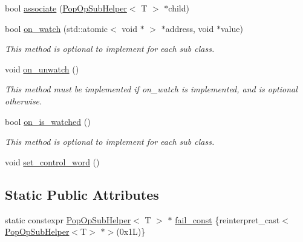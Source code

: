 \begin{DoxyCompactItemize}
bool \hyperlink{classtervel_1_1containers_1_1wf_1_1vector_1_1_pop_op_helper_a7d5839d23d38c1c1762f2b04afb04ff4}{associate} (\hyperlink{classtervel_1_1containers_1_1wf_1_1vector_1_1_pop_op_sub_helper}{Pop\+Op\+Sub\+Helper}$<$ T $>$ $\ast$child)
\item 
bool \hyperlink{classtervel_1_1containers_1_1wf_1_1vector_1_1_pop_op_helper_a2b421b2a3cb984bd94abe3ee254ac819}{on\+\_\+watch} (std\+::atomic$<$ void $\ast$ $>$ $\ast$address, void $\ast$value)
\begin{DoxyCompactList}\small\item\em This method is optional to implement for each sub class. \end{DoxyCompactList}\item 
void \hyperlink{classtervel_1_1containers_1_1wf_1_1vector_1_1_pop_op_helper_a90ee1e07905e336a864184e96d04bf96}{on\+\_\+unwatch} ()
\begin{DoxyCompactList}\small\item\em This method must be implemented if on\+\_\+watch is implemented, and is optional otherwise. \end{DoxyCompactList}\item 
bool \hyperlink{classtervel_1_1containers_1_1wf_1_1vector_1_1_pop_op_helper_afc30533f275eb109ae847e0038404360}{on\+\_\+is\+\_\+watched} ()
\begin{DoxyCompactList}\small\item\em This method is optional to implement for each sub class. \end{DoxyCompactList}\item 
void \hyperlink{classtervel_1_1containers_1_1wf_1_1vector_1_1_pop_op_helper_a54ea71e4dd7949e2b3aa778becf43245}{set\+\_\+control\+\_\+word} ()
\end{DoxyCompactItemize}
\subsection*{Static Public Attributes}
\begin{DoxyCompactItemize}
\item 
static constexpr \hyperlink{classtervel_1_1containers_1_1wf_1_1vector_1_1_pop_op_sub_helper}{Pop\+Op\+Sub\+Helper}$<$ T $>$ $\ast$ \hyperlink{classtervel_1_1containers_1_1wf_1_1vector_1_1_pop_op_helper_a8b5f2f7807984b6a29dbb3b34838eb1f}{fail\+\_\+const} \{reinterpret\+\_\+cast$<$\hyperlink{classtervel_1_1containers_1_1wf_1_1vector_1_1_pop_op_sub_helper}{Pop\+Op\+Sub\+Helper}$<$T$>$ $\ast$$>$(0x1\+L)\}
\end{DoxyCompactItemize}
